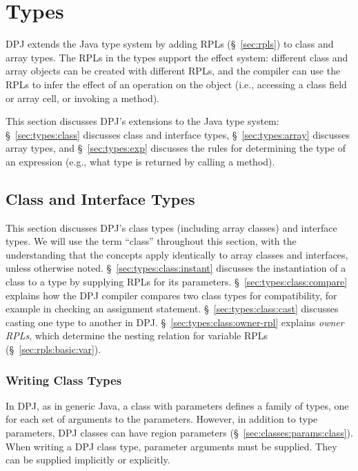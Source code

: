 \section{Types%
\label{sec:types}}

DPJ extends the Java type system by adding RPLs (\S~\ref{sec:rpls}) to
class and array types.  The RPLs in the types support the effect
system: different class and array objects can be created with
different RPLs, and the compiler can use the RPLs to infer the effect
of an operation on the object (i.e., accessing a class field or array
cell, or invoking a method).

This section discusses DPJ's extensions to the Java type system:
\S~\ref{sec:types:class} discusses class and interface types,
\S~\ref{sec:types:array} discusses array types, and
\S~\ref{sec:types:exp} discusses the rules for determining the type of
an expression (e.g., what type is returned by calling a method).

\subsection{Class and Interface Types
\label{sec:types:class}}

This section discusses DPJ's class types (including array classes) and
interface types.  We will use the term ``class'' throughout this
section, with the understanding that the concepts apply identically to
array classes and interfaces, unless otherwise noted.
\S~\ref{sec:types:class:instant} discusses the instantiation of a
class to a type by supplying RPLs for its parameters.
\S~\ref{sec:types:class:compare} explains how the DPJ compiler
compares two class types for compatibility, for example in checking an
assignment statement.  \S~\ref{sec:types:class:cast} discusses casting
one type to another in DPJ.  \S~\ref{sec:types:class:owner-rpl}
explains \emph{owner RPLs}, which determine the nesting relation for
variable RPLs (\S~\ref{sec:rpls:basic:var}).

\subsubsection{Writing Class Types%
\label{sec:types:class:instant}}

In DPJ, as in generic Java, a class with parameters defines a family
of types, one for each set of arguments to the parameters.  However,
in addition to type parameters, DPJ classes can have region parameters
(\S~\ref{sec:classes:params:class}).  When writing a DPJ class type,
parameter arguments must be supplied.  They can be supplied implicitly
or explicitly.

